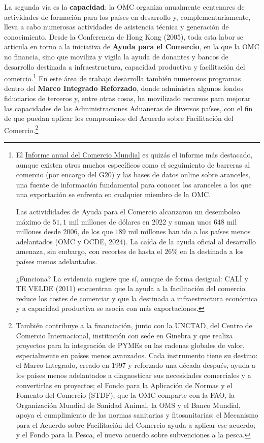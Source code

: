 \documentclass[10pt,a4paper]{article}
\begin{document}
La segunda vía es la \textbf{capacidad}: la OMC organiza anualmente centenares de actividades de formación para los países en desarrollo y, complementariamente, lleva a cabo numerosas actividades de asistencia técnica y generación de conocimiento. Desde la Conferencia de Hong Kong (2005), toda esta labor se articula en torno a la iniciativa de \textbf{Ayuda para el Comercio}, en la que la OMC no financia, sino que moviliza y vigila la ayuda de donantes y bancos de desarrollo destinada a infraestructura, capacidad productiva y facilitación del comercio.\footnote{%
  El \href{https://www.wto.org/spanish/res_s/reser_s/wtr_s.htm}{Informe anual del Comercio Mundial} es quizás el informe más destacado, aunque existen otros muchos específicos como el seguimiento de barreras al comercio (por encargo del G$20$) y las bases de datos online sobre aranceles, una fuente de información fundamental para conocer los aranceles a los que una exportación se enfrenta en cualquier miembro de la OMC.

  Las activididades de Ayuda para el Comercio alcanzaron un desembolso máximo de $51,1$ mil millones de dólares en 2022 y suman unos $648$ mil millones desde 2006, de los que $189$ mil millones han ido a los países menos adelantados (OMC y OCDE, 2024). La caída de la ayuda oficial al desarrollo amenaza, sin embargo, con recortes de hasta el $26\%$ en la destinada a los países menos adelantados.

  ¿Funciona? La evidencia sugiere que sí, aunque de forma desigual: CALÌ y TE VELDE (2011) encuentran que la ayuda a la facilitación del comercio reduce los costes de comerciar y que la destinada a infraestructura económica y a capacidad productiva se asocia con más exportaciones.
} En este área de trabajo desarrolla también numerosos programas dentro del \textbf{Marco Integrado Reforzado}, donde administra algunos fondos fiduciarios de terceros y, entre otras cosas, ha movilizado recursos para mejorar las capacidades de las Administraciones Aduaneras de diversos países, con el fin de que puedan aplicar los compromisos del Acuerdo sobre Facilitación del Comercio.\footnote{%
  También contribuye a la financiación, junto con la UNCTAD, del Centro de Comercio Internacional, institución con sede en Ginebra y que realiza proyectos para la integración de PYMEs en las cadenas globales de valor, especialmente en países menos avanzados. Cada instrumento tiene su destino: el Marco Integrado, creado en 1997 y reforzado una década después, ayuda a los países menos adelantados a diagnosticar sus necesidades comerciales y a convertirlas en proyectos; el Fondo para la Aplicación de Normas y el Fomento del Comercio (STDF), que la OMC comparte con la FAO, la Organización Mundial de Sanidad Animal, la OMS y el Banco Mundial, apoya el cumplimiento de las normas sanitarias y fitosanitarias; el Mecanismo para el Acuerdo sobre Facilitación del Comercio ayuda a aplicar ese acuerdo; y el Fondo para la Pesca, el nuevo acuerdo sobre subvenciones a la pesca.
}
\end{document}
